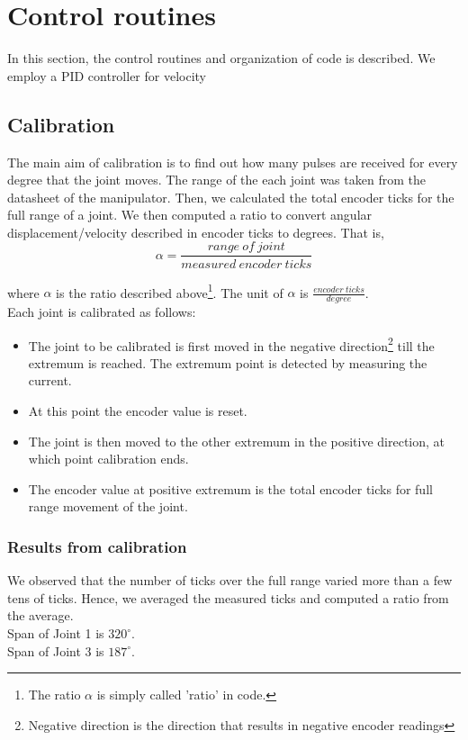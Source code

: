 \documentclass[10pt,a4paper]{article}
\begin{document}
\section{Control routines}

In this section, the control routines and organization of code is
described. We employ a PID controller for velocity 

\subsection{Calibration}

The main aim of calibration is to find out how many pulses are
received for every degree that the joint moves. The range of the each
joint was taken from the datasheet of the manipulator. Then, we
calculated the total encoder ticks for the full range of a joint. We
then computed a ratio to convert angular displacement/velocity
described in encoder ticks to degrees. That is,
\[ \alpha = \frac{range\ of\ joint}{measured\ encoder\ ticks}\]

where \(\alpha\) is the ratio described above\footnote{The ratio
  \(\alpha\) is simply called 'ratio' in code.}. The unit of
\(\alpha\) is \( \frac{encoder\ ticks}{degree}\). \\


Each joint is calibrated as follows:
\begin{itemize}
\item The joint to be calibrated is first moved in the negative
  direction\footnote{Negative direction is the direction that results
    in negative encoder readings} till the extremum is reached. The
  extremum point is detected by measuring the current.
\item At this point the encoder value is reset. 
\item The joint is then moved to the other extremum in the positive
  direction, at which point calibration ends.
\item The encoder value at positive extremum is the total encoder
  ticks for full range movement of the joint.
\end{itemize}

\subsubsection{Results from calibration}

We observed that the number of ticks over the full range varied more
than a few tens of ticks. Hence, we averaged the measured ticks and
computed a ratio from the average. \\ 
Span of Joint 1 is \(320^{\circ}\).\\
Span of Joint 3 is \(187^{\circ}\).\\
\end{document}
